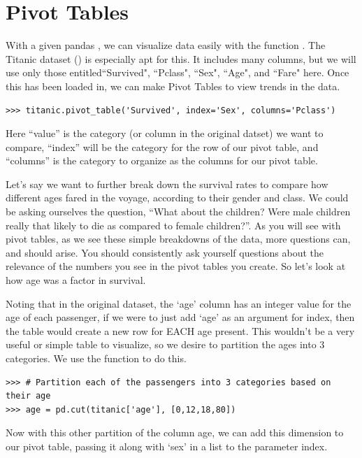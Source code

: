 \section*{Pivot Tables}
With a given pandas , we can visualize data easily with the function . The Titanic dataset () is especially apt for this.  It includes many columns, but we will use only those entitled``Survived", ``Pclass", ``Sex", ``Age", and ``Fare" here.  Once this has been loaded in, we can make Pivot Tables to view trends in the data.

\begin{lstlisting}
>>> titanic.pivot_table('Survived', index='Sex', columns='Pclass')
\end{lstlisting}

Here ``value'' is the category (or column in the original datset) we want to compare, ``index'' will be the category for the row of our pivot table, and ``columns'' is the category to organize as the columns for our pivot table.

Let's say we want to further break down the survival rates to compare how different ages fared in the voyage, according to their gender and class. We could be asking ourselves the question, ``What about the children? Were male children really that likely to die as compared to female children?''. As you will see with pivot tables, as we see these simple breakdowns of the data, more questions can, and should arise. You should consistently ask yourself questions about the relevance of the numbers you see in the pivot tables you create. So let's look at how age was a factor in survival.

Noting that in the original dataset, the `age' column has an integer value for the age of each passenger, if we were to just add `age' as an argument for index, then the table would create a new row for EACH age present. This wouldn't be a very useful or simple table to visualize, so we desire to partition the ages into 3 categories. We use the function  to do this.

\begin{lstlisting}
>>> # Partition each of the passengers into 3 categories based on their age
>>> age = pd.cut(titanic['age'], [0,12,18,80])
\end{lstlisting}

Now with this other partition of the column age, we can add this dimension to our pivot table, passing it along with `sex' in a list to the parameter index.

